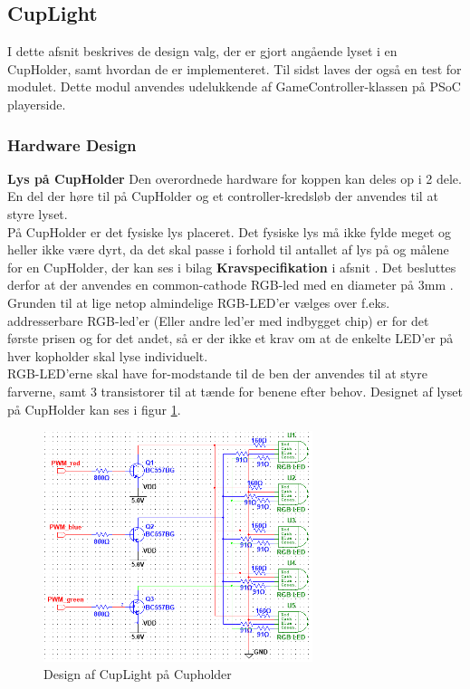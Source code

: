 \documentclass[Rapport/Rapport_main.tex]{subfiles}
\begin{document}
\subsection{CupLight}\label{sec:rap_cup_light}
I dette afsnit beskrives de design valg, der er gjort angående lyset i en CupHolder, samt hvordan de er implementeret. Til sidst laves der også en test for modulet. Dette modul anvendes udelukkende af GameController-klassen på PSoC playerside.
\subsubsection{Hardware Design}
\textbf{Lys på CupHolder}
Den overordnede hardware for koppen kan deles op i 2 dele. En del der høre til på CupHolder og et controller-kredsløb der anvendes til at styre lyset.\\
På CupHolder er det fysiske lys placeret. Det fysiske lys må ikke fylde meget og heller ikke være dyrt, da det skal passe i forhold til antallet af lys på og målene for en CupHolder, der kan ses i bilag \textbf{Kravspecifikation} i afsnit . Det besluttes derfor at der anvendes en common-cathode RGB-led med en diameter på 3mm \cite{Dimensions2015RGB_Led_Datasheet}. Grunden til at lige netop almindelige RGB-LED'er vælges over f.eks. addresserbare RGB-led'er (Eller andre led'er med indbygget chip) er for det første prisen og for det andet, så er der ikke et krav om at de enkelte LED'er på hver kopholder skal lyse individuelt.\\
RGB-LED'erne skal have for-modstande til de ben der anvendes til at styre farverne, samt 3 transistorer\cite{datasheet_bc557b} til at tænde for benene efter behov. Designet af lyset på CupHolder kan ses i figur \ref{fig:rap_cupholder_light}.
\begin{figure}[H]
    \centering
    \includegraphics[width=0.7\textwidth]{HardwareDesign/CupLight/graphics/CupHolder_HW.png}
    \caption{Design af CupLight på Cupholder}
    \label{fig:rap_cupholder_light}
\end{figure}
\end{document}
